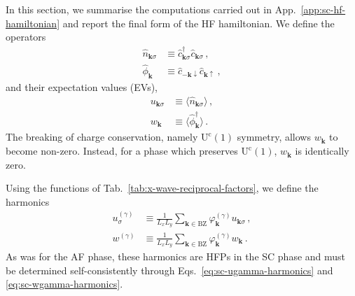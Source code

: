 In this section, we summarise the computations carried out in App.~\ref{app:sc-hf-hamiltonian} and report the final form of the HF hamiltonian. We define the operators
\begin{align}
	\hat n_{\mathbf{k}\sigma} &\equiv \hat c_{\mathbf{k}\sigma}^\dagger \hat c_{\mathbf{k}\sigma} \, , \label{eq:sc-ehm-n-def} \\
	\hat \phi_\mathbf{k} &\equiv \hat c_{-\mathbf{k}\downarrow} \hat c_{\mathbf{k}\uparrow} \, , \label{eq:sc-ehm-phi-def}
\end{align}
and their expectation values (EVs),
\begin{align}
	u_{\mathbf{k}\sigma} &\equiv \langle
	\hat n_{\mathbf{k}\sigma}
	\rangle \, , \label{eq:sc-uqsigma-def} \\
	w_\mathbf{k} &\equiv \langle
	\hat \phi_\mathbf{k}^\dagger
	\rangle \, . \label{eq:sc-wq-def}
\end{align}
The breaking of charge conservation, namely $\mathrm{U}^\mathrm{c}(1)$ symmetry, allows $w_\mathbf{k}$ to become non-zero. Instead, for a phase which preserves $\mathrm{U}^\mathrm{c}(1)$, $w_\mathbf{k}$ is identically zero.

Using the functions of Tab.~\ref{tab:x-wave-reciprocal-factors}, we define the harmonics
\begin{align}
	u^{(\gamma)}_\sigma &\equiv \frac{1}{L_x L_y} \sum_{\mathbf{k}\in\mathrm{BZ}} \varphi_\mathbf{k}^{(\gamma)} u_{\mathbf{k}\sigma} \, , \label{eq:sc-ugamma-harmonics} \\
	w^{(\gamma)} &\equiv \frac{1}{L_x L_y} \sum_{\mathbf{k}\in\mathrm{BZ}} \varphi_\mathbf{k}^{(\gamma)} w_\mathbf{k} \, . \label{eq:sc-wgamma-harmonics}
\end{align}
As was for the AF phase, these harmonics are HFPs in the SC phase and must be determined self-consistently through Eqs.~\eqref{eq:sc-ugamma-harmonics} and \eqref{eq:sc-wgamma-harmonics}.

